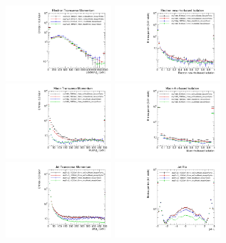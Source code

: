 
\begin{figure}
\centering
\includegraphics[width=0.35\textwidth]{figures/r_hadrons/e_pt_1000GeV_10mm.pdf}
\includegraphics[width=0.35\textwidth]{figures/r_hadrons/e_iso_1000GeV_10mm.pdf}
\includegraphics[width=0.35\textwidth]{figures/r_hadrons/mu_pt500_1000GeV_10mm.pdf}
\includegraphics[width=0.35\textwidth]{figures/r_hadrons/mu_iso_1000GeV_10mm.pdf}
\includegraphics[width=0.35\textwidth]{figures/r_hadrons/jet_pt_1000GeV_10mm.pdf}
\includegraphics[width=0.35\textwidth]{figures/r_hadrons/jet_eta_1000GeV_10mm.pdf}

\end{figure}
